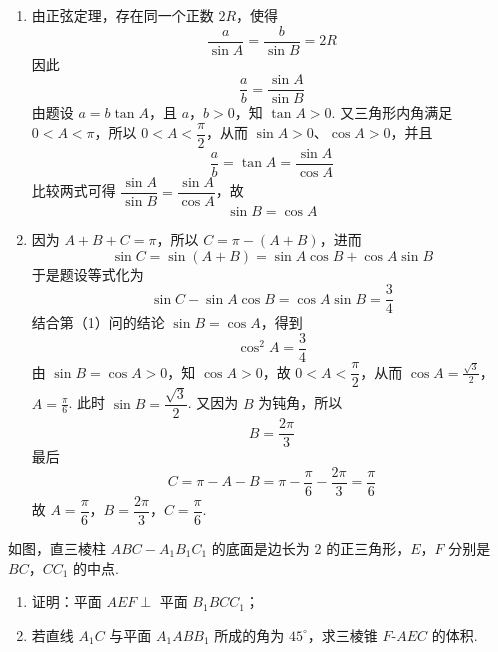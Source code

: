 \begin{solution}
\begin{enumerate}
\item 由正弦定理，存在同一个正数 \(2R\)，使得
\[
\frac{a}{\sin A}=\frac{b}{\sin B}=2R
\]
因此
\[
\frac{a}{b}=\frac{\sin A}{\sin B}
\]
由题设 \(a=b\tan A\)，且 \(a\)，\(b>0\)，知 \(\tan A>0\). 又三角形内角满足 \(0<A<\pi\)，所以 \(0<A<\dfrac{\pi}{2}\)，从而 \(\sin A>0\)、\(\cos A>0\)，并且
\[
\frac{a}{b}=\tan A=\frac{\sin A}{\cos A}
\]
比较两式可得 \(\dfrac{\sin A}{\sin B}=\dfrac{\sin A}{\cos A}\)，故
\[
\sin B=\cos A
\]

\item 因为 \(A+B+C=\pi\)，所以 \(C=\pi-(A+B)\)，进而
\[
\sin C=\sin(A+B)=\sin A\cos B+\cos A\sin B
\]
于是题设等式化为
\[
\sin C-\sin A\cos B=\cos A\sin B=\frac{3}{4}
\]
结合第（1）问的结论 \(\sin B=\cos A\)，得到
\[
\cos^{2}A=\frac{3}{4}
\]
由 \(\sin B=\cos A>0\)，知 \(\cos A>0\)，故 \(0<A<\dfrac{\pi}{2}\)，从而
\(\cos A=\frac{\sqrt{3}}{2}\)，\(A=\frac{\pi}{6}\).
此时 \(\sin B=\dfrac{\sqrt{3}}{2}\). 又因为 \(B\) 为钝角，所以
\[
B=\frac{2\pi}{3}
\]
最后
\[
C=\pi-A-B=\pi-\frac{\pi}{6}-\frac{2\pi}{3}=\frac{\pi}{6}
\]
故 \(A=\dfrac{\pi}{6}\)，\(B=\dfrac{2\pi}{3}\)，\(C=\dfrac{\pi}{6}\).
\end{enumerate}
\end{solution}

\begin{problem}
如图，直三棱柱 \(ABC - A_{1}B_{1}C_{1}\) 的底面是边长为 \(2\) 的正三角形，\(E\)，\(F\) 分别是 \(BC\)，\(CC_{1}\) 的中点.
\begin{enumerate}
\item 证明：平面 \(AEF \perp\) 平面 \(B_{1}BCC_{1}\)；
\item 若直线 \(A_{1}C\) 与平面 \(A_{1}ABB_{1}\) 所成的角为 \( 45^{\circ} \)，求三棱锥 \(F\text{-}AEC\) 的体积.
\end{enumerate}

\end{problem}

